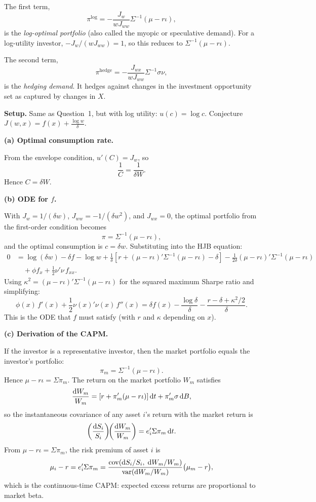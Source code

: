 The first term,
$$\pi^{\text{log}} = -\frac{J_w}{wJ_{ww}}\Sigma^{-1}(\mu - r\iota),$$
is the \emph{log-optimal portfolio} (also called the myopic or speculative demand).  For a log-utility investor, $-J_w/(wJ_{ww}) = 1$, so this reduces to $\Sigma^{-1}(\mu - r\iota)$.

The second term,
$$\pi^{\text{hedge}} = -\frac{J_{wx}}{wJ_{ww}}\Sigma^{-1}\sigma\nu,$$
is the \emph{hedging demand}.  It hedges against changes in the investment opportunity set as captured by changes in $X$.


\textbf{Setup.} Same as Question~1, but with log utility: $u(c) = \log c$.  Conjecture $J(w,x) = f(x) + \frac{\log w}{\delta}$.

\baselineskip
\textbf{(a) Optimal consumption rate.}

From the envelope condition, $u'(C) = J_w$, so
$$\frac{1}{C} = \frac{1}{\delta W}.$$
Hence $C = \delta W$.

\baselineskip
\textbf{(b) ODE for $f$.}

With $J_w = 1/(\delta w)$, $J_{ww} = -1/(\delta w^2)$, and $J_{wx} = 0$, the optimal portfolio from the first-order condition becomes
$$\pi = \Sigma^{-1}(\mu - r\iota),$$
and the optimal consumption is $c = \delta w$.  Substituting into the HJB equation:
\begin{align*}
0 &= \log(\delta w) - \delta f - \log w + \frac{1}{\delta}\!\left[r + (\mu - r\iota)'\Sigma^{-1}(\mu - r\iota) - \delta\right] - \frac{1}{2\delta}(\mu - r\iota)'\Sigma^{-1}(\mu - r\iota)\\
  &\quad + \phi f_x + \frac{1}{2}\nu'\nu\,f_{xx}.
\end{align*}
Using $\kappa^2 = (\mu - r\iota)'\Sigma^{-1}(\mu - r\iota)$ for the squared maximum Sharpe ratio and simplifying:
$$\phi(x)\,f'(x) + \frac{1}{2}\nu(x)'\nu(x)\,f''(x) = \delta f(x) - \frac{\log \delta}{\delta} - \frac{r - \delta + \kappa^2/2}{\delta}.$$
This is the ODE that $f$ must satisfy (with $r$ and $\kappa$ depending on $x$).

\baselineskip
\textbf{(c) Derivation of the CAPM.}

If the investor is a representative investor, then the market portfolio equals the investor's portfolio:
$$\pi_m = \Sigma^{-1}(\mu - r\iota).$$
Hence $\mu - r\iota = \Sigma\pi_m$.  The return on the market portfolio $W_m$ satisfies
$$\frac{\mathrm{d} W_m}{W_m} = \left[r + \pi_m'(\mu - r\iota)\right]\mathrm{d} t + \pi_m'\sigma\,\mathrm{d} B,$$
so the instantaneous covariance of any asset $i$'s return with the market return is
$$\left(\frac{\mathrm{d} S_i}{S_i}\right)\!\!\left(\frac{\mathrm{d} W_m}{W_m}\right) = e_i'\Sigma\pi_m\,\mathrm{d} t.$$
From $\mu - r\iota = \Sigma\pi_m$, the risk premium of asset $i$ is
$$\mu_i - r = e_i'\Sigma\pi_m = \frac{\operatorname{cov}\!\left(\mathrm{d} S_i/S_i,\;\mathrm{d} W_m/W_m\right)}{\operatorname{var}(\mathrm{d} W_m/W_m)}\bigl(\mu_m - r\bigr),$$
which is the continuous-time CAPM: expected excess returns are proportional to market beta.

